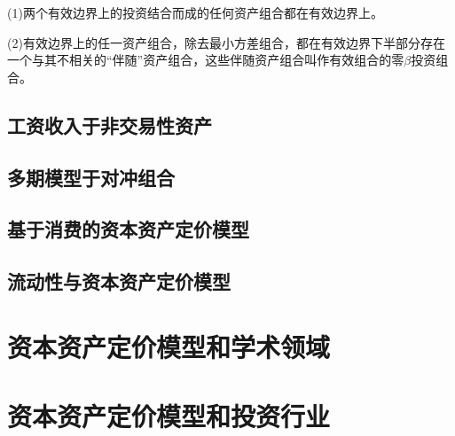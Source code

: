 \documentclass{article}
\begin{document}
(1)两个有效边界上的投资结合而成的任何资产组合都在有效边界上。

(2)有效边界上的任一资产组合，除去最小方差组合，都在有效边界下半部分存在一个与其不相关的“伴随”资产组合，这些伴随资产组合叫作有效组合的零$ \beta $投资组合。

\subsection{工资收入于非交易性资产}

\subsection{多期模型于对冲组合}

\subsection{基于消费的资本资产定价模型}

\subsection{流动性与资本资产定价模型}


\section{资本资产定价模型和学术领域}

\section{资本资产定价模型和投资行业}

	
\end{document}
